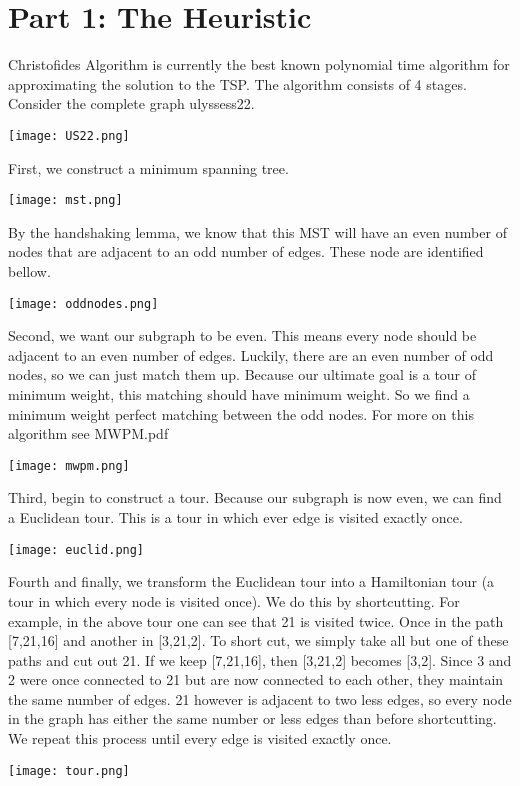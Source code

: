 \documentclass{article}
\begin{document}
    \section*{Part 1: The Heuristic}
        Christofides Algorithm is currently the best known polynomial time algorithm for approximating the solution to
        the TSP. The algorithm consists of 4 stages.
        Consider the complete graph ulyssess22.
        \begin{center}
            \texttt{[image: US22.png]}
        \end{center}

        First, we construct a minimum spanning tree.
        \begin{center}
            \texttt{[image: mst.png]}
        \end{center}
        By the handshaking lemma, we know that this MST will have
        an even number of nodes that are adjacent to an odd number of
        edges.
        These node are identified bellow.
        \begin{center}
            \texttt{[image: oddnodes.png]}
        \end{center}

        Second, we want our subgraph to be even.
        This means every node should be adjacent to an even number of edges.
        Luckily, there are an even number of odd nodes, so we can just
        match them up.
        Because our ultimate goal is a tour of minimum weight, this matching should
        have minimum weight.
        So we find a minimum weight perfect matching between the odd nodes.
        For more on this algorithm see MWPM.pdf
        \begin{center}
            \texttt{[image: mwpm.png]}
        \end{center}

        Third, begin to construct a tour.
        Because our subgraph is now even, we can find a Euclidean tour.
        This is a tour in which ever edge is visited exactly once.
        \begin{center}
            \texttt{[image: euclid.png]}
        \end{center}

        Fourth and finally, we transform the Euclidean tour into a Hamiltonian tour (a tour in which every node
        is visited once).
        We do this by shortcutting.
        For example, in the above tour one can see that 21 is visited twice.
        Once in the path [7,21,16] and another in [3,21,2].
        To short cut, we simply take all but one of these paths and cut out 21.
        If we keep [7,21,16], then [3,21,2] becomes [3,2].
        Since 3 and 2 were once connected to 21 but are now connected
        to each other, they maintain the same number of edges.
        21 however is adjacent to two less edges, so every node in the graph has either
        the same number or less edges than before shortcutting.
        We repeat this process until every edge is visited exactly once.
        \begin{center}
            \texttt{[image: tour.png]}
        \end{center}
\end{document}
